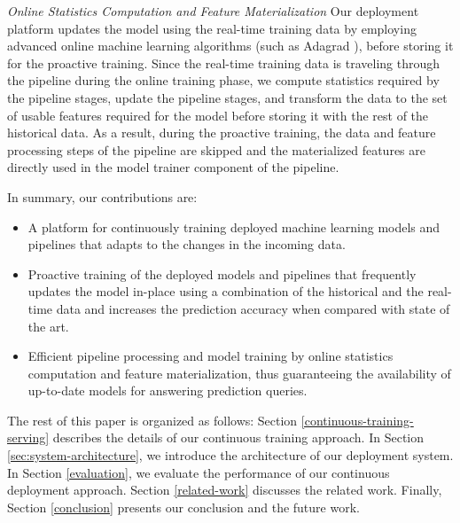 \textit{Online Statistics Computation and Feature Materialization}
Our deployment platform updates the model using the real-time training data by employing advanced online machine learning algorithms (such as Adagrad \cite{duchi2011adaptive}), before storing it for the proactive training.
Since the real-time training data is traveling through the pipeline during the online training phase, we compute statistics required by the pipeline stages, update the pipeline stages, and transform the data to the set of usable features required for the model before storing it with the rest of the historical data.
As a result, during the proactive training, the data and feature processing steps of the pipeline are skipped and the materialized features are directly used in the model trainer component of the pipeline.

In summary, our contributions are:
\begin{itemize}
\item A platform for continuously training deployed machine learning models and pipelines that adapts to the changes in the incoming data.
\item Proactive training of the deployed models and pipelines that frequently updates the model in-place using a combination of the historical and the real-time data and increases the prediction accuracy when compared with state of the art.
\item Efficient pipeline processing and model training by online statistics computation and feature materialization, thus guaranteeing the availability of up-to-date models for answering prediction queries.
\end{itemize}

The rest of this paper is organized as follows:
Section \ref{continuous-training-serving} describes the details of our continuous training approach.
In Section \ref{sec:system-architecture}, we introduce the architecture of our deployment system.
In Section \ref{evaluation}, we evaluate the performance of our continuous deployment approach.
Section \ref {related-work} discusses the related work.
Finally, Section \ref{conclusion} presents our conclusion and the future work.
